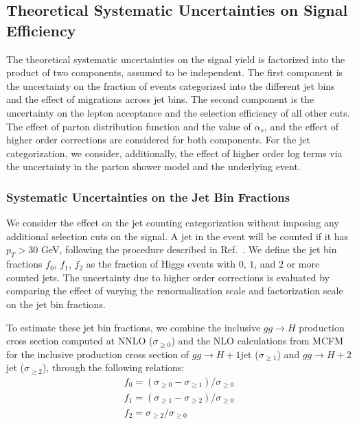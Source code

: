 \subsection{Theoretical Systematic Uncertainties on Signal Efficiency}
\label{sec:theorySystematicsSignal}
The theoretical systematic uncertainties on the signal yield is factorized into the
product of two components, assumed to be independent. The first component is the uncertainty
on the fraction of events categorized into the different jet bins and the effect
of migrations across jet bins. The second component is the uncertainty
on the lepton acceptance and the selection efficiency of all other cuts. The effect of
parton distribution function and the value of $\alpha_{s}$, and the effect of 
higher order corrections are considered for both components. For the jet categorization,
we consider, additionally, the effect of higher order log terms via the uncertainty in the 
parton shower model and the underlying event.

\subsubsection{Systematic Uncertainties on the Jet Bin Fractions}
\label{sec:HiggsJetBinFractionSystematics}
We consider the effect on the jet counting categorization without imposing any additional
selection cuts on the signal. A jet in the event will be counted if it has $p_{T} > 30$ GeV, 
following the procedure described in Ref.~\cite{HWW2011AN}. 
We define the jet bin fractions $f_{0}$, $f_{1}$, $f_{2}$
as the fraction of Higgs events with $0$, $1$, and $2$ or more counted jets. 
The uncertainty due to higher order corrections is evaluated by comparing the effect of
varying the renormalization scale and factorization scale on the jet bin fractions. 

To estimate these jet bin fractions, we combine the inclusive $gg \to H$ production cross section
computed at NNLO \cite{LHCHiggsCrossSectionWorkingGroup:2011ti} ($\sigma_{\geq 0}$) and the 
NLO calculations from MCFM \cite{MCFMHiggsProduction} for the inclusive production cross section 
of $gg \to H+1$jet ($\sigma_{\geq 1}$) and $gg \to H+2$jet ($\sigma_{\geq 2}$), 
through the following relations:
\begin{eqnarray}
\label{eqn:jetBinFractions}
  f_{0} = (\sigma_{\geq 0} - \sigma_{\geq 1} ) / \sigma_{\geq 0} \\
  f_{1} = (\sigma_{\geq 1} - \sigma_{\geq 2} ) / \sigma_{\geq 0} \\
  f_{2} = \sigma_{\geq 2} / \sigma_{\geq 0} \\
\end{eqnarray}


